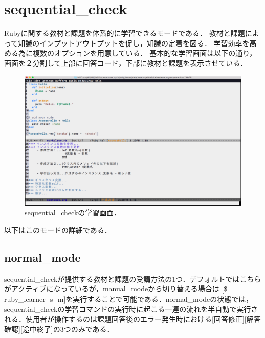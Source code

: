 \section{sequential\_check}\label{sequential_check}
Rubyに関する教材と課題を体系的に学習できるモードである．
教材と課題によって知識のインプットアウトプットを促し，知識の定着を図る．
学習効率を高める為に複数のオプションを用意している．
基本的な学習画面は以下の通り，画面を２分割して上部に回答コード，下部に教材と課題を表示させている．
\begin{figure}[H]
\centering
\begin{center}
\includegraphics[width=150mm]{../../picture/seq.png}
\end{center}
\caption{sequential\_checkの学習画面．\label{seq}}
\end{figure}
以下はこのモードの詳細である．

\subsection{normal\_mode}\label{nomal_mode}
sequential\_checkが提供する教材と課題の受講方法の1つ．デフォルトではこちらがアクティブになっているが，manual\_modeから切り替える場合は [\$ ruby\_learner -s -m]を実行することで可能である．normal\_modeの状態では，sequential\_checkの学習コマンドの実行時に起こる一連の流れを半自動で実行される．使用者が操作するのは課題回答後のエラー発生時における[回答修正][解答確認][途中終了]の3つのみである．

